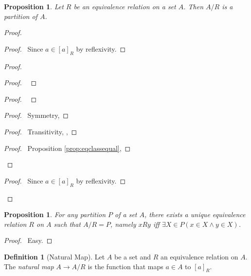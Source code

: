 \documentclass{book}
\let\qed\relax
\newtheorem{prop}[ax]{Proposition}
\theoremstyle{definition}
\newtheorem{df}[ax]{Definition}
\begin{document}
\begin{prop}
Let $R$ be an equivalence relation on a set $A$. Then $A/R$ is a partition of $A$.
\end{prop}

\begin{proof}
\pf
{}
\begin{proof}
	\pf\ Since $a \in [a]_R$ by reflexivity.
\end{proof}
\begin{proof}
	\begin{proof}
		\pf\ 
	\end{proof}
	\begin{proof}
		\pf\ 
	\end{proof}
	\begin{proof}
		\pf\ Symmetry, 
	\end{proof}
	\begin{proof}
		\pf\ Transitivity, , 
	\end{proof}
	\begin{proof}
		\pf\ Proposition \ref{prop:eqclassequal}, 
	\end{proof}
\end{proof}
\begin{proof}
	\pf\ Since $a \in [a]_R$ by reflexivity.
\end{proof}
\qed
\end{proof}

\begin{prop}
For any partition $P$ of a set $A$, there exists a unique equivalence relation $R$ on $A$ such that $A/R = P$, namely $xRy$ iff $\exists X \in P(x \in X \wedge y \in X)$.
\end{prop}

\begin{proof}
\pf\ Easy. \qed
\end{proof}

\begin{df}[Natural Map]
Let $A$ be a set and $R$ an equivalence relation on $A$. The \emph{natural map} $A \rightarrow A / R$ is the function that maps $a \in A$ to $[a]_R$.
\end{df}
\end{document}
